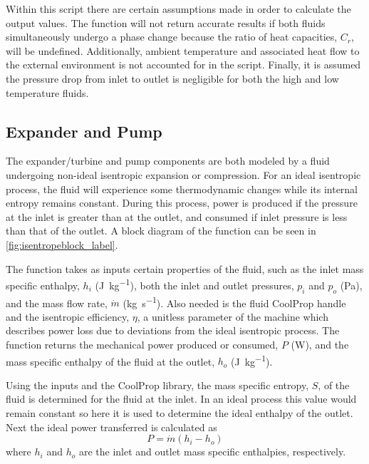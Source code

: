 Within this script there are certain assumptions made in order to calculate the output values. The function will not return accurate results if both fluids simultaneously undergo a phase change because the ratio of heat capacities, $C_r$, will be undefined. Additionally, ambient temperature and associated heat flow to the external environment is not accounted for in the script. Finally, it is assumed the pressure drop from inlet to outlet is negligible for both the high and low temperature fluids. 


\subsection{Expander and Pump}
\label{sec:isentrope}
The expander/turbine and pump components are both modeled by a fluid undergoing non-ideal isentropic expansion or compression. For an ideal isentropic process, the fluid will experience some thermodynamic changes while its internal entropy remains constant. During this process, power is produced if the pressure at the inlet is greater than at the outlet, and consumed if inlet pressure is less than that of the outlet. A block diagram of the function can be seen in \autoref{fig:isentropeblock_label}.


The function takes as inputs certain properties of the fluid, such as the inlet mass specific enthalpy, $h_i$ (\si{\joule\per\kilogram}), both the inlet and outlet pressures, $p_i$ and $p_o$ (\si{\pascal}), and the mass flow rate, $\dot{m}$ (\si{\kilogram\per\second}). Also needed is the fluid CoolProp\textsuperscript{\textcopyright} handle and the isentropic efficiency, $\eta$, a unitless parameter of the machine which describes power loss due to deviations from the ideal isentropic process. The function returns the mechanical power produced or consumed, $P$ (\si{\watt}), and the mass specific enthalpy of the fluid at the outlet, $h_o$ (\si{\joule\per\kilogram}).

Using the inputs and the CoolProp\textsuperscript{\textcopyright} library, the mass specific entropy, $S$, of the fluid is determined for the fluid at the inlet. In an ideal process this value would remain constant so here it is used to determine the ideal enthalpy of the outlet. Next the ideal power transferred is calculated as 
\begin{equation}
\label{eq:power_enthalpy}
P = \dot{m} \left(h_i - h_o\right)
\end{equation}
where $h_i$ and $h_o$ are the inlet and outlet mass specific enthalpies, respectively.

